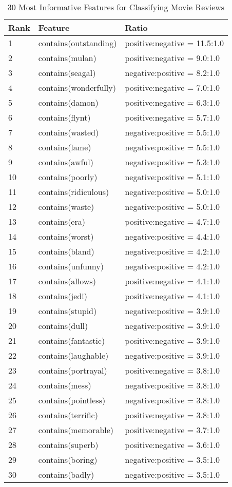 \documentclass{article}
\begin{document}
\begin{table}
\centering
\begin{tabular}{|l|l|l|}
	\hline
	\textbf{Rank} & \textbf{Feature} & \textbf{Ratio} \\
	\hline
	1 & contains(outstanding) & positive:negative = 11.5:1.0 \\
	2 & contains(mulan) & positive:negative = 9.0:1.0 \\
	3 & contains(seagal) & negative:positive = 8.2:1.0 \\
	4 & contains(wonderfully) & positive:negative = 7.0:1.0 \\
	5 & contains(damon) & positive:negative = 6.3:1.0 \\
	6 & contains(flynt) & positive:negative = 5.7:1.0 \\
	7 & contains(wasted) & negative:positive = 5.5:1.0 \\
	8 & contains(lame) & negative:positive = 5.5:1.0 \\
	9 & contains(awful) & negative:positive = 5.3:1.0 \\
	10 & contains(poorly) & negative:positive = 5.1:1.0 \\
	11 & contains(ridiculous) & negative:positive = 5.0:1.0 \\
	12 & contains(waste) & negative:positive = 5.0:1.0 \\
	13 & contains(era) & positive:negative = 4.7:1.0 \\
	14 & contains(worst) & negative:positive = 4.4:1.0 \\
	15 & contains(bland) & negative:positive = 4.2:1.0 \\
	16 & contains(unfunny) & negative:positive = 4.2:1.0 \\
	17 & contains(allows) & positive:negative = 4.1:1.0 \\
	18 & contains(jedi) & positive:negative = 4.1:1.0 \\
	19 & contains(stupid) & negative:positive = 3.9:1.0 \\
	20 & contains(dull) & negative:positive = 3.9:1.0 \\
	21 & contains(fantastic) & positive:negative = 3.9:1.0 \\
	22 & contains(laughable) & negative:positive = 3.9:1.0 \\
	23 & contains(portrayal) & positive:negative = 3.8:1.0 \\
	24 & contains(mess) & negative:positive = 3.8:1.0 \\
	25 & contains(pointless) & negative:positive = 3.8:1.0 \\
	26 & contains(terrific) & positive:negative = 3.8:1.0 \\
	27 & contains(memorable) & positive:negative = 3.7:1.0 \\
	28 & contains(superb) & positive:negative = 3.6:1.0 \\
	29 & contains(boring) & negative:positive = 3.5:1.0 \\
	30 & contains(badly) & negative:positive = 3.5:1.0 \\
	\hline
\end{tabular}
\caption{30 Most Informative Features for Classifying Movie Reviews}
\label{tab:informative_features_doc_classification}
\end{table}
\end{document}
